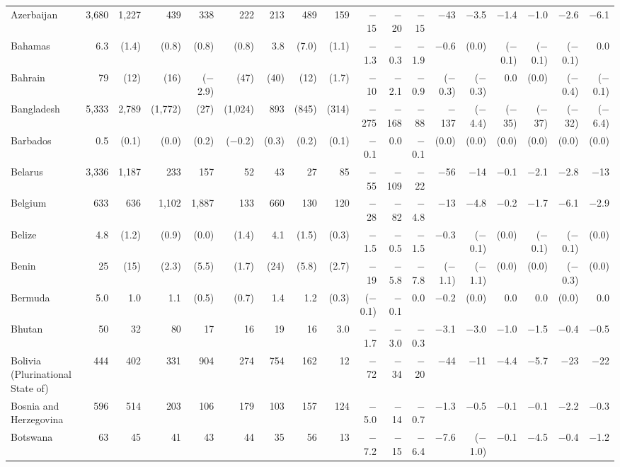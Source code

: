\begin{longtable}{lrrrrrrrrrrrrrrrrr}
Azerbaijan & 3,680 & 1,227 & 439 & 338 & 222 & 213 & 489 & 159 & $-$15 & $-$20 & $-$15 & $-$43 & $-$3.5 & $-$1.4 & $-$1.0 & $-$2.6 & $-$6.1 \\
Bahamas & 6.3 & (1.4) & (0.8) & (0.8) & (0.8) & 3.8 & (7.0) & (1.1) & $-$1.3 & $-$0.3 & $-$1.9 & $-$0.6 & (0.0) & ($-$0.1) & ($-$0.1) & ($-$0.1) & 0.0 \\
Bahrain & 79 & (12) & (16) & ($-$2.9) & (47) & (40) & (12) & (1.7) & $-$10 & $-$2.1 & $-$0.9 & ($-$0.3) & ($-$0.3) & 0.0 & (0.0) & ($-$0.4) & ($-$0.1) \\
Bangladesh & 5,333 & 2,789 & (1,772) & (27) & (1,024) & 893 & (845) & (314) & $-$275 & $-$168 & $-$88 & $-$137 & ($-$4.4) & ($-$35) & ($-$37) & ($-$32) & ($-$6.4) \\
Barbados & 0.5 & (0.1) & (0.0) & (0.2) & ($-$0.2) & (0.3) & (0.2) & (0.1) & $-$0.1 & 0.0 & $-$0.1 & (0.0) & (0.0) & (0.0) & (0.0) & (0.0) & (0.0) \\
Belarus & 3,336 & 1,187 & 233 & 157 & 52 & 43 & 27 & 85 & $-$55 & $-$109 & $-$22 & $-$56 & $-$14 & $-$0.1 & $-$2.1 & $-$2.8 & $-$13 \\
Belgium & 633 & 636 & 1,102 & 1,887 & 133 & 660 & 130 & 120 & $-$28 & $-$82 & $-$4.8 & $-$13 & $-$4.8 & $-$0.2 & $-$1.7 & $-$6.1 & $-$2.9 \\
Belize & 4.8 & (1.2) & (0.9) & (0.0) & (1.4) & 4.1 & (1.5) & (0.3) & $-$1.5 & $-$0.5 & $-$1.5 & $-$0.3 & ($-$0.1) & (0.0) & ($-$0.1) & ($-$0.1) & (0.0) \\
Benin & 25 & (15) & (2.3) & (5.5) & (1.7) & (24) & (5.8) & (2.7) & $-$19 & $-$5.8 & $-$7.8 & ($-$1.1) & ($-$1.1) & (0.0) & (0.0) & ($-$0.3) & (0.0) \\
Bermuda & 5.0 & 1.0 & 1.1 & (0.5) & (0.7) & 1.4 & 1.2 & (0.3) & ($-$0.1) & $-$0.1 & 0.0 & $-$0.2 & (0.0) & 0.0 & 0.0 & (0.0) & 0.0 \\
Bhutan & 50 & 32 & 80 & 17 & 16 & 19 & 16 & 3.0 & $-$1.7 & $-$3.0 & $-$0.3 & $-$3.1 & $-$3.0 & $-$1.0 & $-$1.5 & $-$0.4 & $-$0.5 \\
Bolivia (Plurinational State of) & 444 & 402 & 331 & 904 & 274 & 754 & 162 & 12 & $-$72 & $-$34 & $-$20 & $-$44 & $-$11 & $-$4.4 & $-$5.7 & $-$23 & $-$22 \\
Bosnia and Herzegovina & 596 & 514 & 203 & 106 & 179 & 103 & 157 & 124 & $-$5.0 & $-$14 & $-$0.7 & $-$1.3 & $-$0.5 & $-$0.1 & $-$0.1 & $-$2.2 & $-$0.3 \\
Botswana & 63 & 45 & 41 & 43 & 44 & 35 & 56 & 13 & $-$7.2 & $-$15 & $-$6.4 & $-$7.6 & ($-$1.0) & $-$0.1 & $-$4.5 & $-$0.4 & $-$1.2 \\

\end{longtable}
